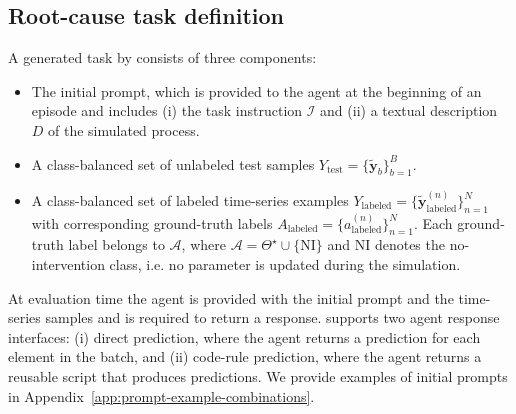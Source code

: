 \subsection{Root-cause task definition}
A generated task by \name{} consists of three components:
\begin{itemize}
    \item The initial prompt, which is provided to the agent at the beginning of an episode and includes (i) the task instruction $\mathcal{I}$ and (ii) a textual description $D$ of the simulated process.
    \item A class-balanced set of unlabeled test samples $Y_{\text{test}}=\{\tilde{\mathbf{y}}_b\}_{b=1}^{B}$.
    \item A class-balanced set of labeled time-series examples $Y_{\text{labeled}}=\{\tilde{\mathbf{y}}_{\text{labeled}}^{(n)}\}_{n=1}^{N}$ with corresponding ground-truth labels $A_{\text{labeled}}=\{a_{\text{labeled}}^{(n)}\}_{n=1}^{N}$.
    Each ground-truth label belongs to $\mathcal{A}$,  where \(\mathcal{A}=\Theta^\star\cup\{\mathrm{NI}\}\) and $\mathrm{NI}$ denotes the no-intervention class, i.e. no parameter is updated during the simulation.
\end{itemize} 
At evaluation time the agent is provided with the initial prompt and the time-series samples and is required to return a response.
\name{} supports two agent response interfaces: (i) direct prediction, where the agent returns a prediction for each element in the batch, and (ii) code-rule prediction, where the agent returns a reusable script that produces predictions.
We provide examples of initial prompts in Appendix~\ref{app:prompt-example-combinations}.

